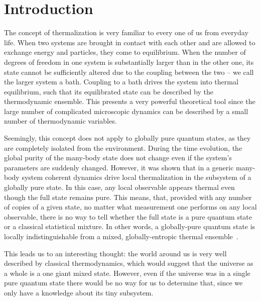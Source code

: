 \chapter{Introduction}
\label{introduction}

The concept of thermalization is very familiar to every one of us from everyday life. When two systems are brought in contact with each other and are allowed to exchange energy and particles, they come to equilibrium. When the number of degrees of freedom in one system is substantially larger than in the other one, its state cannot be sufficiently altered due to the coupling between the two -- we call the larger system a bath. Coupling to a bath drives the system into thermal equilibrium, such that its equilibrated state can be described by the thermodynamic ensemble. This presents a very powerful theoretical tool since the large number of complicated microscopic dynamics can be described by a small number of thermodynamic variables.

Seemingly, this concept does not apply to globally pure quantum states, as they are completely isolated from the environment. During the time evolution, the global purity of the many-body state does not change even if the system's parameters are suddenly changed. However, it was shown \cite{Deutsch1991, Rigol2008, Eisert2015} that in a generic many-body system coherent dynamics drive local thermalization in the subsystem of a globally pure state. In this case, any local observable appears thermal even though the full state remains pure. This means, that, provided with any number of copies of a given state,  no matter what measurement one performs on any local observable, there is no way to tell whether the full state is a pure quantum state or a classical statistical mixture. In other words, a globally-pure quantum state is locally indistinguishable from a mixed, globally-entropic thermal ensemble~\cite{Shankar1985, Deutsch1991, Srednicki1994, Rigol2008}.

This leads us to an interesting thought: the world around us is very well described by classical thermodynamics, which would suggest that the universe as a whole is a one giant mixed state. However, even if the universe was in a single pure quantum state there would be no way for us to determine that, since we only have a knowledge about its tiny subsystem.


